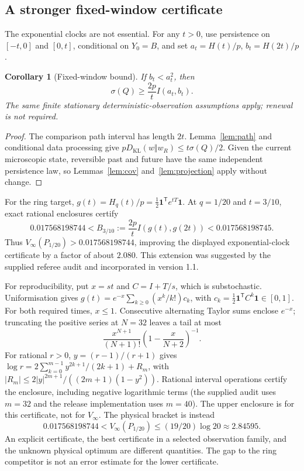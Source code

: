 \documentclass[11pt,a4paper]{article}
\newtheorem{corollary}[theorem]{Corollary}
\newcommand{\KL}{D_{\mathrm{KL}}}
\newcommand{\one}{\mathbf 1}
\newcommand{\sig}{\sigma}
\begin{document}
\subsection{A stronger fixed-window certificate}\label{sec:fixed}
The exponential clocks are not essential. For any $t>0$, use persistence on $[-t,0]$ and $[0,t]$, conditional on $Y_0=B$, and set $a_t=H(t)/p$, $b_t=H(2t)/p$.
\begin{corollary}[Fixed-window bound]\label{cor:fixed}
If $b_t<a_t^2$, then
\[
\sig(Q)\geq \frac{2p}{t}I(a_t,b_t).
\]
The same finite stationary deterministic-observation assumptions apply; renewal is not required.
\end{corollary}
\begin{proof}
The comparison path interval has length $2t$. Lemma~\ref{lem:path} and conditional data processing give $p\KL(w\Vert w_R)\leq t\sig(Q)/2$. Given the current microscopic state, reversible past and future have the same independent persistence law, so Lemmas~\ref{lem:cov} and~\ref{lem:projection} apply without change.
\end{proof}
For the ring target, $g(t)=H_q(t)/p=\tfrac12\one^{\mathsf T}e^{tT}\one$. At $q=1/20$ and $t=3/10$, exact rational enclosures certify
\[
0.017568198744 < B_{3/10}:=\frac{2p}{t}I(g(t),g(2t)) < 0.017568198745.
\]
Thus $V_\infty(P_{1/20})>0.017568198744$, improving the displayed exponential-clock certificate by a factor of about $2.080$. This extension was suggested by the supplied referee audit and incorporated in version 1.1.

For reproducibility, put $x=st$ and $C=I+T/s$, which is substochastic. Uniformisation gives $g(t)=e^{-x}\sum_{k\geq0}(x^k/k!)c_k$, with $c_k=\tfrac12\one^{\mathsf T}C^k\one\in[0,1]$. For both required times, $x\leq1$. Consecutive alternating Taylor sums enclose $e^{-x}$; truncating the positive series at $N=32$ leaves a tail at most
\[
\frac{x^{N+1}}{(N+1)!}\left(1-\frac{x}{N+2}\right)^{-1}.
\]
For rational $r>0$, $y=(r-1)/(r+1)$ gives $\log r=2\sum_{k=0}^{m-1}y^{2k+1}/(2k+1)+R_m$, with
$|R_m|\leq2|y|^{2m+1}/((2m+1)(1-y^2))$.
Rational interval operations certify the enclosure, including negative logarithmic terms (the supplied audit uses $m=32$ and the release implementation uses $m=40$). The upper enclosure is for this certificate, not for $V_\infty$. The physical bracket is instead
\[
0.017568198744<V_\infty(P_{1/20})\leq(19/20)\log20\approx2.84595.
\]
An explicit certificate, the best certificate in a selected observation family, and the unknown physical optimum are different quantities. The gap to the ring competitor is not an error estimate for the lower certificate.
\end{document}
